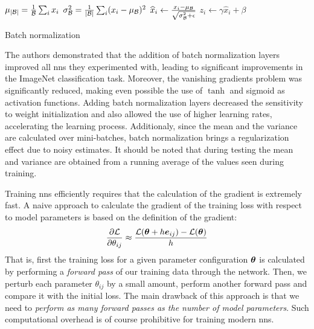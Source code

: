 \begin{algorithm}[H]
	\BlankLine
	$\mu_{\lvert \mathcal{B}\rvert} = \frac{1}{\mathcal{B}} \sum_i x_i$\;
	$\sigma_{\mathcal{B}}^2 =
	\frac{1}{\lvert \mathcal{B}\rvert} \sum_i (x_i - \mu_{\mathcal{B}})^2$\;
	$\widehat{x}_i \gets
	\frac{x_i - \mu_{\mathcal{B}}}{\sqrt{\sigma_{\mathcal{B}}^2 + \epsilon}}$\;
	$z_i \gets \gamma \widehat{x}_i + \beta$\;
	\caption{Batch normalization}
	\label{algo:batch_norm}
\end{algorithm}
The authors demonstrated that the addition of batch normalization layers
improved all \glspl{nn} they experimented with, leading to significant
improvements in the ImageNet classification task. Moreover, the vanishing
gradients problem was significantly reduced, making even possible the use of
$\tanh$ and sigmoid as activation functions. Adding batch normalization layers
decreased the sensitivity to weight initialization and also allowed the use of
higher learning rates, accelerating the learning process. Additionaly, since the
mean and the variance are calculated over mini-batches, batch normalization
brings a regularization effect due to noisy estimates. It should be noted that
during testing the mean and variance are obtained from a running average of the
values seen during training.

Training \glspl{nn} efficiently requires that the calculation of the gradient is
extremely fast. A naive approach to calculate the gradient of the training
loss with respect to model parameters is based on the
definition of the gradient:
\begin{equation}
	\frac{\partial \mathcal{L}}{\partial \theta_{ij}} \approx
	\frac{\mathcal{L}(\boldsymbol{\theta} + h\boldsymbol{e}_{ij}) - \mathcal{L}(\boldsymbol{\theta})}{h}
\end{equation}
That is, first the training loss for a given parameter configuration $\boldsymbol{\theta}$ is
calculated by performing a \emph{forward pass} of our
training data through the network. Then, we perturb each
parameter $\theta_{ij}$ by a small amount, perform another forward pass and
compare it with the initial loss. The main drawback of this approach is that we
need to \emph{perform as many forward passes as the number of model parameters}.
Such computational overhead is of course prohibitive for training modern
\glspl{nn}.

